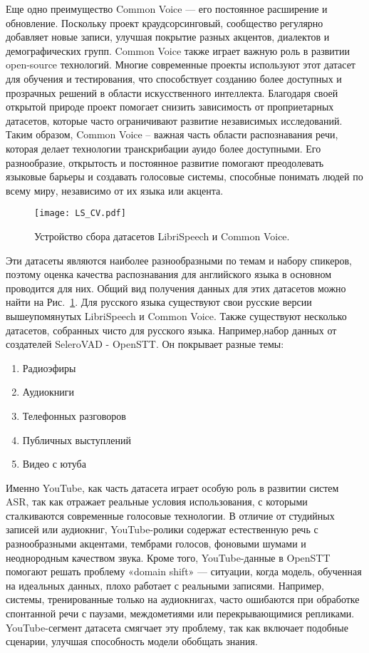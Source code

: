 Еще одно преимущество Common Voice — его постоянное расширение и обновление. Поскольку проект краудсорсинговый, сообщество регулярно добавляет новые записи, улучшая покрытие разных акцентов, диалектов и демографических групп.
Common Voice также играет важную роль в развитии open-source технологий.
Многие современные проекты используют этот датасет для обучения и тестирования, что способствует созданию более доступных и прозрачных решений в области искусственного интеллекта.
Благодаря своей открытой природе проект помогает снизить зависимость от проприетарных датасетов, которые часто ограничивают развитие независимых исследований.
Таким образом, Common Voice -- важная часть области распознавания речи, которая делает технологии транскрибации ауидо более доступными.
Его разнообразие, открытость и постоянное развитие помогают преодолевать языковые барьеры и создавать голосовые системы, способные понимать людей по всему миру, независимо от их языка или акцента.

\begin{figure}[!t]
  \centering
  \texttt{[image: LS\_CV.pdf]}
  \caption{Устройство сбора датасетов LibriSpeech и Common Voice.}
  \label{fig:ls_cv}
\end{figure}

Эти датасеты являются наиболее разнообразными по темам и набору спикеров, поэтому оценка качества распознавания для английского языка в основном проводится для них.
Общий вид получения данных для этих датасетов можно найти на Рис.~\ref{fig:ls_cv}.
Для русского языка существуют свои русские версии вышеупомянутых LibriSpeech и Common Voice.
Также существуют несколько датасетов, собранных чисто для русского языка. 
Например,набор данных от создателей SeleroVAD - OpenSTT. 
Он покрывает разные темы: 
\begin{enumerate}
  \item Радиоэфиры
  \item Аудиокниги
  \item Телефонных разговоров
  \item Публичных выступлений
  \item Видео с ютуба
\end{enumerate}
Именно YouTube, как часть датасета играет особую роль в развитии систем ASR, так как отражает реальные условия использования, с которыми сталкиваются современные голосовые технологии.
В отличие от студийных записей или аудиокниг, YouTube-ролики содержат естественную речь с разнообразными акцентами, тембрами голосов, фоновыми шумами и неоднородным качеством звука. 
Кроме того, YouTube-данные в OpenSTT помогают решать проблему «domain shift» — ситуации, когда модель, обученная на идеальных данных, плохо работает с реальными записями.
Например, системы, тренированные только на аудиокнигах, часто ошибаются при обработке спонтанной речи с паузами, междометиями или перекрывающимися репликами.
YouTube-сегмент датасета смягчает эту проблему, так как включает подобные сценарии, улучшая способность модели обобщать знания.

